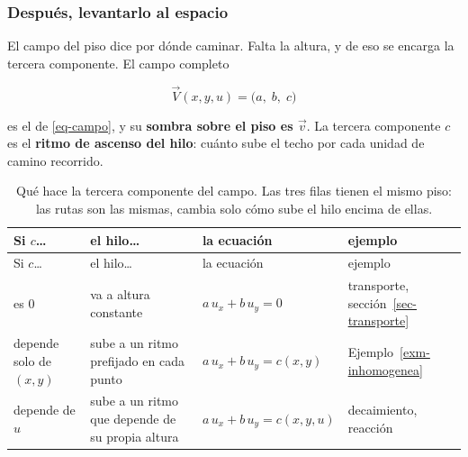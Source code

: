 \documentclass[
  spanish,
  a4paper,
]{scrbook}
\theoremstyle{definition}
\theoremstyle{plain}
\theoremstyle{definition}
\theoremstyle{plain}
\theoremstyle{definition}
\theoremstyle{remark}
\begin{document}
\subsubsection{Después, levantarlo al espacio}\label{sec-campo-espacio}

El campo del piso dice por dónde caminar. Falta la altura, y de eso se
encarga la tercera componente. El campo completo

\[
\vec V(x,y,u) = \big(a,\; b,\; c\big)
\]

es el de \ref{eq-campo}, y su \textbf{sombra sobre el piso es
\(\vec v\)}. La tercera componente \(c\) es el \textbf{ritmo de ascenso
del hilo}: cuánto sube el techo por cada unidad de camino recorrido.

\begin{longtable}[]{@{}
  >{\raggedright\arraybackslash}p{}
  >{\raggedright\arraybackslash}p{}
  >{\raggedright\arraybackslash}p{}
  >{\raggedright\arraybackslash}p{}@{}}
\caption{Qué hace la tercera componente del campo. Las tres filas tienen
el mismo piso: las rutas son las mismas, cambia solo cómo sube el hilo
encima de ellas.}\label{tbl-tercera-componente}\tabularnewline
\toprule\noalign{}
\begin{minipage}[b]{\linewidth}\raggedright
Si \(c\)\ldots{}
\end{minipage} & \begin{minipage}[b]{\linewidth}\raggedright
el hilo\ldots{}
\end{minipage} & \begin{minipage}[b]{\linewidth}\raggedright
la ecuación
\end{minipage} & \begin{minipage}[b]{\linewidth}\raggedright
ejemplo
\end{minipage} \\
\midrule\noalign{}
\endfirsthead
\toprule\noalign{}
\begin{minipage}[b]{\linewidth}\raggedright
Si \(c\)\ldots{}
\end{minipage} & \begin{minipage}[b]{\linewidth}\raggedright
el hilo\ldots{}
\end{minipage} & \begin{minipage}[b]{\linewidth}\raggedright
la ecuación
\end{minipage} & \begin{minipage}[b]{\linewidth}\raggedright
ejemplo
\end{minipage} \\
\midrule\noalign{}
\endhead
\bottomrule\noalign{}
\endlastfoot
es \(0\) & va a altura constante & \(a\,u_x + b\,u_y = 0\) & transporte,
sección~\ref{sec-transporte} \\
depende solo de \((x,y)\) & sube a un ritmo prefijado en cada punto &
\(a\,u_x + b\,u_y = c(x,y)\) & Ejemplo~\ref{exm-inhomogenea} \\
depende de \(u\) & sube a un ritmo que depende de su propia altura &
\(a\,u_x + b\,u_y = c(x,y,u)\) & decaimiento, reacción \\
\end{longtable}
\end{document}
